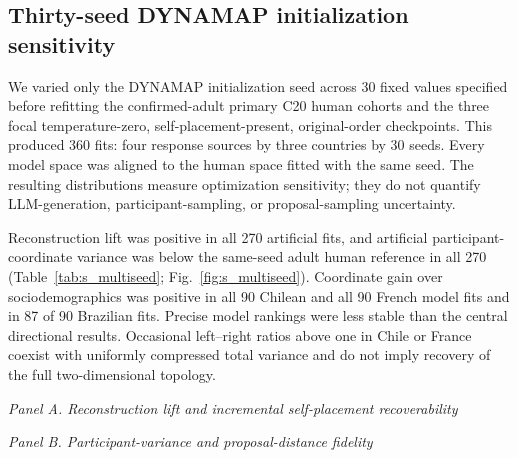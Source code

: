 \documentclass[unnumsec,webpdf,modern,large]{oup-authoring-template}
\begin{document}
\subsection{Thirty-seed DYNAMAP initialization sensitivity}

We varied only the DYNAMAP initialization seed across 30 fixed values specified before refitting the confirmed-adult primary C20 human cohorts and the three focal temperature-zero, self-placement-present, original-order checkpoints. This produced 360 fits: four response sources by three countries by 30 seeds. Every model space was aligned to the human space fitted with the same seed. The resulting distributions measure optimization sensitivity; they do not quantify LLM-generation, participant-sampling, or proposal-sampling uncertainty.

Reconstruction lift was positive in all 270 artificial fits, and artificial participant-coordinate variance was below the same-seed adult human reference in all 270 (Table~\ref{tab:s_multiseed}; Fig.~\ref{fig:s_multiseed}). Coordinate gain over sociodemographics was positive in all 90 Chilean and all 90 French model fits and in 87 of 90 Brazilian fits. Precise model rankings were less stable than the central directional results. Occasional left--right ratios above one in Chile or France coexist with uniformly compressed total variance and do not imply recovery of the full two-dimensional topology.

\begin{table}[p]
\caption{DYNAMAP initialization sensitivity across 30 seeds. Entries are seed means with 5th and 95th percentiles. Each artificial fit is normalized or aligned to the same-seed human fit. Lift is reconstruction accuracy minus the held-out majority rule; $\Delta$ coord. is held-out self-placement classification accuracy minus the sociodemographic baseline.}
\label{tab:s_multiseed}
\centering
\footnotesize
\textit{Panel A. Reconstruction lift and incremental self-placement recoverability}\par\smallskip

\medskip

\textit{Panel B. Participant-variance and proposal-distance fidelity}\par\smallskip

\end{table}
\end{document}
